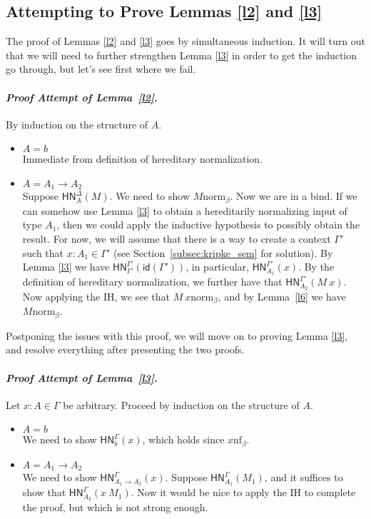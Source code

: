 \documentclass{article}
\newenvironment{prfattemptref}[1]{\paragraph{\emph{Proof Attempt of #1}.}}{\hfill\color{red}{X}\par}
\newcommand{\bnf}[1]{#1 \mathrel{\text{nf}_\beta}}
\newcommand{\bnorm}[1]{\ensuremath{#1 \mathrel{\text{norm}_\beta}}}
\newcommand{\hnorm}[3]{\ensuremath{\mathsf{HN}^{#1}_{#2}(#3)}}
\newcommand{\id}[1]{\ensuremath{\mathsf{id}(#1)}}
\newcommand{\fn}[2]{\ensuremath{#1 \to #2}}
\newcommand{\ap}[2]{\ensuremath{#1\ #2}}
\begin{document}
\subsection{Attempting to Prove Lemmas \ref{l2} and \ref{l3}}

The proof of Lemmas \ref{l2} and \ref{l3} goes by simultaneous induction.  It will turn out that
we will need to further strengthen Lemma \ref{l3} in order to get the induction go through, but
let's see first where we fail.

\begin{prfattemptref}{Lemma~\ref{l2}}
By induction on the structure of $A$.
\begin{itemize}
  \setlength\itemsep{1em}
  \item $A = b$\\
  Immediate from definition of hereditary normalization.
\item $A = \fn{A_1}{A_2}$\\
  Suppose $\hnorm{\Delta}{A}{M}$. We need to show $\bnorm{M}$. Now we are in a bind. If we can
  somehow use Lemma \ref{l3} to obtain a hereditarily normalizing input of type $A_1$, then we
  could apply the inductive hypothesis to possibly obtain the result. For now, we will
  assume that there is a way to create a context $\Gamma'$ such that $x : A_1 \in \Gamma'$ (see
  Section~\ref{subsec:kripke_sem} for solution).  By Lemma \ref{l3} we have
  $\hnorm{\Gamma'}{\Gamma'}{\id{\Gamma'}}$, in particular, $\hnorm{\Gamma'}{A_1}{x}$. By the
  definition of hereditary normalization, we further have that
  $\hnorm{\Gamma'}{A_2}{\ap{M}{x}}$. Now applying the IH, we see that $\bnorm{\ap{M}{x}}$, and
  by Lemma~\ref{l6} we have $\bnorm{M}$.  \qedhere
\end{itemize}
\end{prfattemptref}

Postponing the issues with this proof, we will move on to proving Lemma \ref{l3}, and resolve everything after
presenting the two proofs.

\begin{prfattemptref}{Lemma~\ref{l3}}
Let $x : A \in \Gamma$ be arbitrary. Proceed by induction on the structure of $A$.
\begin{itemize}
  \setlength\itemsep{1em}
  \item $A = b$\\
  We need to show $\hnorm{\Gamma}{b}{x}$, which holds since $\bnf{x}$.
  \item $A = \fn{A_1}{A_2}$\\
  We need to show $\hnorm{\Gamma}{\fn{A_1}{A_2}}{x}$. Suppose $\hnorm{\Gamma}{A_1}{M_1}$, and it suffices to show
  that $\hnorm{\Gamma}{A_2}{\ap{x}{M_1}}$. Now it would be nice to apply the IH to complete the proof, but which
  is not strong enough.
\end{itemize}
\end{prfattemptref}
\end{document}
